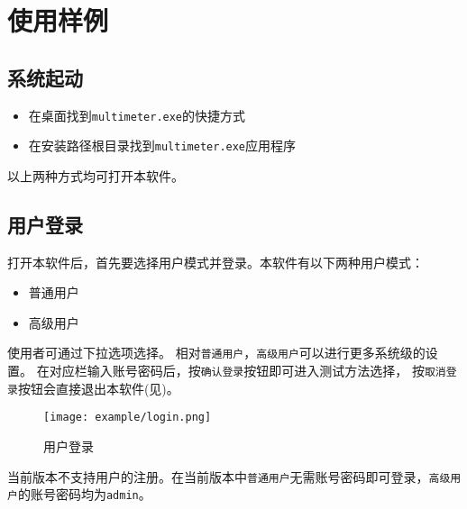 \chapter{使用样例}
\section{系统起动}
\begin{itemize}
	\item 在桌面找到\lstinline{multimeter.exe}的快捷方式
	\item 在安装路径根目录找到\lstinline{multimeter.exe}应用程序
\end{itemize}
以上两种方式均可打开本软件。
\section{用户登录}
打开本软件后，首先要选择用户模式并登录。本软件有以下两种用户模式：
\begin{itemize}
	\item 普通用户
	\item 高级用户
\end{itemize}
使用者可通过下拉选项选择。
相对\lstinline{普通用户}，\lstinline{高级用户}可以进行更多系统级的设置。
在对应栏输入账号密码后，按\lstinline{确认登录}按钮即可进入测试方法选择，
按\lstinline{取消登录}按钮会直接退出本软件(见)。
\begin{figure}[htbp]
	\centering
	\texttt{[image: example/login.png]}
	\caption{ 用户登录 \label{fig:exmp_login}}
\end{figure}
\begin{note}
	当前版本不支持用户的注册。在当前版本中\lstinline{普通用户}无需账号密码即可登录，\lstinline{高级用户}的账号密码均为\lstinline{admin}。
\end{note}













